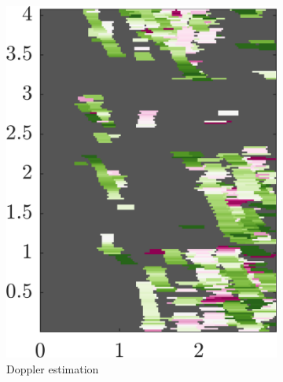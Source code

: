 \begin{figure}[htbp]
\begin{subfigure}[t]{0.32\linewidth}
        \includegraphics[width=\linewidth]{gfx/results/torturechamber_doppler.png}
        \caption{\small Doppler estimation}
    \end{subfigure}%
    \hfill%
    \begin{subfigure}[t]{0.32\linewidth}   
        \centering 

\end{subfigure}
\end{figure}
